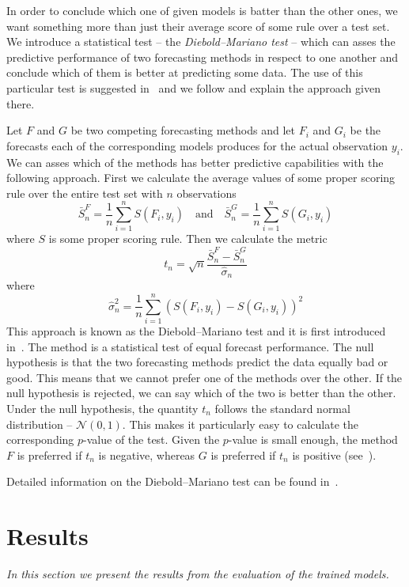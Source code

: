 \documentclass[12pt,a4paper,twoside]{scrartcl}
\numberwithin{equation}{section}
\begin{document}
In order to conclude which one of given models is batter than the other ones, we want something more than just their average score of some rule over a test set. We introduce a statistical test -- the \emph{Diebold–Mariano test} -- which can asses the predictive performance of two forecasting methods in respect to one another and conclude which of them is better at predicting some data. The use of this particular test is suggested in~\cite{gneiting2014} and we follow and explain the approach given there.

Let \(F\) and \(G\) be two competing forecasting methods and let \(F_i \) and \(G_i \) be the forecasts each of the corresponding models produces for the actual observation \(y_i \). We can asses which of the methods has better predictive capabilities with the following approach. First we calculate the average values of some proper scoring rule over the entire test set with \(n\) observations
\begin{equation}
  \bar{S}^F_n=\frac{1}{n}\sum_{i=1}^nS(F_i, y_i) \quad \text{and} \quad \bar{S}^G_n=\frac{1}{n}\sum_{i=1}^nS(G_i, y_i)
\end{equation}
where \(S \) is some proper scoring rule. Then we calculate the metric
\begin{equation}
  t_n=\sqrt{n}\frac{\bar{S}_n^F-\bar{S}_n^G}{\hat{\sigma}_n}
\end{equation}
where
\begin{equation}
  \hat{\sigma}_n^2=\frac{1}{n}\sum_{i=1}^n(S(F_i,y_i)-S(G_i,y_i))^2
\end{equation}
This approach is known as the Diebold–Mariano test and it is first introduced in~\cite{diebold95}. The method is a statistical test of equal forecast performance. The null hypothesis is that the two forecasting methods predict the data equally bad or good. This means that we cannot prefer one of the methods over the other. If the null hypothesis is rejected, we can say which of the two is better than the other. Under the null hypothesis, the quantity \(t_n\) follows the standard normal distribution -- \(\mathcal{N}(0,1)\). This makes it particularly easy to calculate the corresponding \(p\)-value of the test. Given the \(p\)-value is small enough, the method \(F\) is preferred if \(t_n\) is negative, whereas \(G\) is preferred if \(t_n\) is positive (see~\cite{gneiting2014}).

\noindent Detailed information on the Diebold–Mariano test can be found in~\cite{diebold2015}.
\clearpage
\section{Results}\label{sec:res}
\emph{In this section we present the results from the evaluation of the trained models.}
\end{document}

